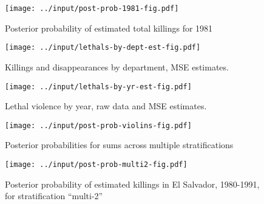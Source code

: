 \documentclass[11pt,]{article}
\begin{document}
\begin{figure}
\centering
\texttt{[image: ../input/post-prob-1981-fig.pdf]}
\caption{Posterior probability of estimated total killings for 1981}
\end{figure}

\begin{figure}
\centering
\texttt{[image: ../input/lethals-by-dept-est-fig.pdf]}
\caption{Killings and disappearances by department, MSE estimates.}
\end{figure}

\begin{figure}
\centering
\texttt{[image: ../input/lethals-by-yr-est-fig.pdf]}
\caption{Lethal violence by year, raw data and MSE estimates.}
\end{figure}

\begin{figure}
\centering
\texttt{[image: ../input/post-prob-violins-fig.pdf]}
\caption{Posterior probabilities for sums across multiple
stratifications}
\end{figure}

\begin{figure}
\centering
\texttt{[image: ../input/post-prob-multi2-fig.pdf]}
\caption{Posterior probability of estimated killings in El Salvador,
1980-1991, for stratification ``multi-2''}
\end{figure}
\end{document}
